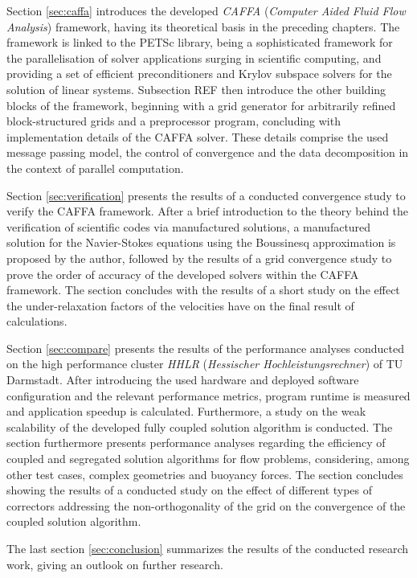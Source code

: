 Section \ref{sec:caffa} introduces the developed \emph{CAFFA} (\emph{Computer Aided Fluid Flow Analysis}) framework, having its theoretical basis in the preceding chapters. The framework is linked to the PETSc library, being a sophisticated framework for the parallelisation of solver applications surging in scientific computing, and providing a set of efficient preconditioners and Krylov subspace solvers for the solution of linear systems. Subsection REF then introduce the other building blocks of the framework, beginning with a grid generator for arbitrarily refined block-structured grids and a preprocessor program, concluding with implementation details of the CAFFA solver. These details comprise the used message passing model, the control of convergence and the data decomposition in the context of parallel computation.

Section \ref{sec:verification} presents the results of a conducted convergence study to verify the CAFFA framework. After a brief introduction to the theory behind the verification of scientific codes via manufactured solutions, a manufactured solution for the Navier-Stokes equations using the Boussinesq approximation is proposed by the author, followed by the results of a grid convergence study to prove the order of accuracy of the developed solvers within the CAFFA framework. The section concludes with the results of a short study on the effect the under-relaxation factors of the velocities have on the final result of calculations.

Section \ref{sec:compare} presents the results of the performance analyses conducted on the high performance cluster \emph{HHLR} (\emph{Hessischer Hochleistungsrechner}) of TU Darmstadt. After introducing the used hardware and deployed software configuration and the relevant performance metrics, program runtime is measured and application speedup is calculated. Furthermore, a study on the weak scalability of the developed fully coupled solution algorithm is conducted. The section furthermore presents performance analyses regarding the efficiency of coupled and segregated solution algorithms for flow problems, considering, among other test cases, complex geometries and buoyancy forces. The section concludes showing the results of a conducted study on the effect of different types of correctors addressing the non-orthogonality of the grid on the convergence of the coupled solution algorithm.

The last section \ref{sec:conclusion} summarizes the results of the conducted research work, giving an outlook on further research.

